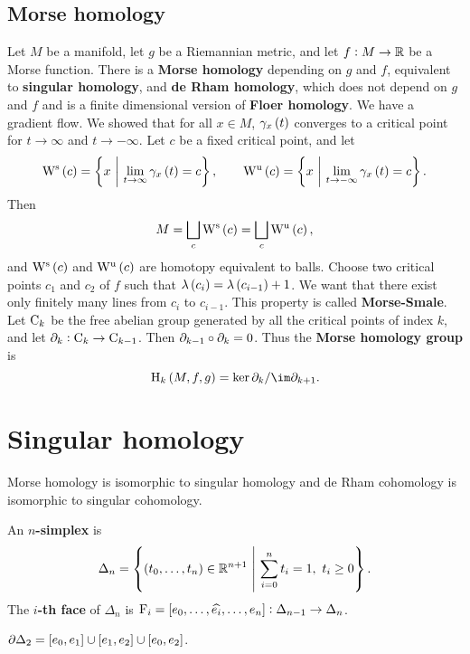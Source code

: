 \subsection{Morse homology}

Let $ M $ be a manifold, let $ g $ be a Riemannian metric, and let $ f : M \to \mathbb{R} $ be a Morse function. There is a \textbf{Morse homology} depending on $ g $ and $ f $, equivalent to \textbf{singular homology}, and \textbf{de Rham homology}, which does not depend on $ g $ and $ f $ and is a finite dimensional version of \textbf{Floer homology}. We have a gradient flow. We showed that for all $ x \in M $, $ \gamma_x\br{t} $ converges to a critical point for $ t \to \infty $ and $ t \to -\infty $. Let $ c $ be a fixed critical point, and let
$$ \W^\s\br{c} = \cbr{x \st \lim_{t \to \infty} \gamma_x\br{t} = c}, \qquad \W^\u\br{c} = \cbr{x \st \lim_{t \to -\infty} \gamma_x\br{t} = c}. $$
Then
$$ M = \bigsqcup_c \W^\s\br{c} = \bigsqcup_c \W^\u\br{c}, $$
and $ \W^\s\br{c} $ and $ \W^\u\br{c} $ are homotopy equivalent to balls. Choose two critical points $ c_1 $ and $ c_2 $ of $ f $ such that $ \lambda\br{c_i} = \lambda\br{c_{i - 1}} + 1 $. We want that there exist only finitely many lines from $ c_i $ to $ c_{i - 1} $. This property is called \textbf{Morse-Smale}. Let $ \mathrm{C}_k $ be the free abelian group generated by all the critical points of index $ k $, and let $ \partial_k : \mathrm{C}_k \to \mathrm{C}_{k - 1} $. Then $ \partial_{k - 1} \circ \partial_k = 0 $. Thus the \textbf{Morse homology group} is
$$ \H_k\br{M, f, g} = \ker \da_k / \im \da_{k + 1}. $$

\pagebreak

\section{Singular homology}


Morse homology is isomorphic to singular homology and de Rham cohomology is isomorphic to singular cohomology.

\begin{definition}
An \textbf{$ n $-simplex} is
$$ \Delta_n = \cbr{\br{t_0, \dots, t_n} \in \RR^{n + 1} \st \sum_{i = 0}^n t_i = 1, \ t_i \ge 0}. $$
The \textbf{$ i $-th face} of $ \Delta_n $ is $ \F_i = \sbr{e_0, \dots, \widehat{e_i}, \dots, e_n} : \Delta_{n - 1} \to \Delta_n $.
\end{definition}

\begin{example}
$ \da\Delta_2 = \sbr{e_0, e_1} \cup \sbr{e_1, e_2} \cup \sbr{e_0, e_2} $.
\end{example}

